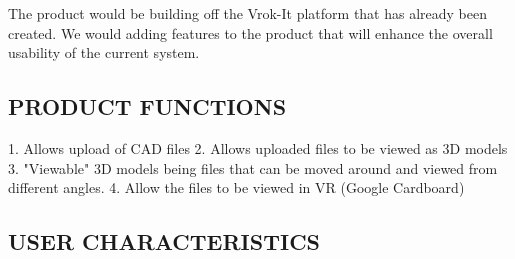 \documentclass[letterpaper, 10pt, draftclsnofoot, onecolumn]{IEEEtran}
\begin{document}
{\color{black}
\begin{comment}

\foreignlanguage{english}{\textit{This subsection of the document should
put the product into perspective with other related products. \ If the
product \ is independent and totally self-contained, it should be so
stated here. If the document de[FB01?]nes a product that is a component
of a larger system, then this subsection should relate the requirements
of \ that larger system to functionality of the software and should
identify interfaces between that system and the software. \ A block
diagram showing the major components of the larger system,
interconnections, and external interfaces can be
helpful.}}\foreignlanguage{english}{\textbf{\textit{ }}}}
\end{comment}
{\color{black}
The product would be building off the Vrok-It platform that has already been created. We would adding features to the product that will enhance the overall usability of the current system.    }

\subsection[PRODUCT
FUNCTIONS]{\rmfamily\bfseries\color{black}
PRODUCT FUNCTIONS}
\begin{comment}

{\selectlanguage{english}\itshape\color{black}
This subsection of the document should provide a summary of the major
functions that the software will perform. \ For the sake of clarity The
functions should be organized in a way that makes the list of functions
understandable to the \ customer or to anyone else reading the document
for the first time. \ Textual or graphical methods can be used to show
the different functions and their relationships. \ Such a diagram is
not intended to show a design of a product, but simply shows the
logical relationships among variables.}
\end{comment}
{\color{black}
1.	Allows upload of CAD files
2.	Allows uploaded files to be viewed as 3D models
3.	"Viewable" 3D models being files that can be moved around and viewed from different angles.
4.	Allow the files to be viewed in VR (Google Cardboard)
}

\subsection[USER
CHARACTERISTICS]{\rmfamily\bfseries\color{black}
USER CHARACTERISTICS}
\begin{comment}


\end{comment}}
\end{document}
